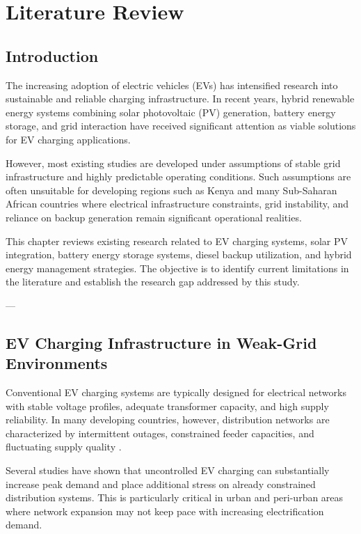 \section{Literature Review}

\subsection{Introduction}

The increasing adoption of electric vehicles (EVs) has intensified research into sustainable and reliable charging infrastructure. In recent years, hybrid renewable energy systems combining solar photovoltaic (PV) generation, battery energy storage, and grid interaction have received significant attention as viable solutions for EV charging applications.

However, most existing studies are developed under assumptions of stable grid infrastructure and highly predictable operating conditions. Such assumptions are often unsuitable for developing regions such as Kenya and many Sub-Saharan African countries where electrical infrastructure constraints, grid instability, and reliance on backup generation remain significant operational realities.

This chapter reviews existing research related to EV charging systems, solar PV integration, battery energy storage systems, diesel backup utilization, and hybrid energy management strategies. The objective is to identify current limitations in the literature and establish the research gap addressed by this study.

---

\subsection{EV Charging Infrastructure in Weak-Grid Environments}

Conventional EV charging systems are typically designed for electrical networks with stable voltage profiles, adequate transformer capacity, and high supply reliability. In many developing countries, however, distribution networks are characterized by intermittent outages, constrained feeder capacities, and fluctuating supply quality \cite{africa_ev_grid}.

Several studies have shown that uncontrolled EV charging can substantially increase peak demand and place additional stress on already constrained distribution systems. This is particularly critical in urban and peri-urban areas where network expansion may not keep pace with increasing electrification demand.

